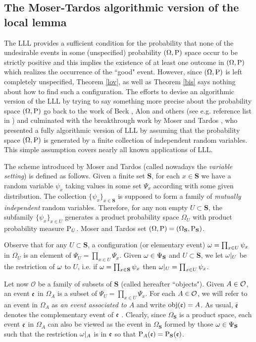\documentclass[11pt]{article}
\let\O=\Omega \let\P=\Pi \let\Ps=\Psi \let\Si=\Sigma \let\X=\Xi
\let\\=\noindent
\begin{document}
\subsection{The Moser-Tardos algorithmic version of the local lemma}
The LLL provides a sufficient condition for the probability that
none of the undesirable events in some (unspecified) probability $(\O,\prob)$ space occur to be strictly positive  and this
implies the existence of at least one outcome in $(\O,\prob)$
which realizes the occurrence of the ``good" event.  However, since  $(\O,\prob)$  is left completely unspecified,   Theorem \ref{lov},
as well as Theorem \ref{bis}  says nothing about how to find
such a configuration. The efforts to devise an  algorithmic version of the LLL by trying to say something more precise
about the probability space  $(\O,\prob)$   go back to the work of Beck
 \cite{B},  Alon \cite{A} and others   (see e.g. reference list in  \cite{Mo2}) and
 culminated with the  breakthrough work by Moser and Tardos \cite{Mo,MT}, who  presented a fully  algorithmic version
 of LLL by assuming that the   probability space $(\O,\prob)$  is generated by a finite collection of independent random variables. This simple assumption
 covers nearly  all known applications of LLL.
\def\obj{{\rm obj}}

\\The scheme   introduced by    Moser and Tardos  (called nowadays the {\it  variable setting}) is defined as follows.
  Given a finite set $\mathbf{S}$, for each  $x\in \mathbf{S}$ we have
a random variable   $\psi_x$ taking values in some set $\Psi_x$ according with some given distribution.
The collection $\{\psi_x\}_{x\in \mathbf{S}}$  is supposed to form a family of  {\it mutually independent} random variables.
Therefore, for any non empty $U\subset \mathbf{S}$, the subfamily  $\{\psi_x\}_{x\in U}$  generates a product probability space
  $\O_U$  with product probability measure ${\rm P}_U$.
  Moser and Tardos set  $(\O,\prob)=(\O_\mathbf{S}, \prob_\mathbf{S})$.

\\Observe that  for any $U\subset \mathbf{S}$, a configuration (or elementary event) $\omega=\prod_{x\in U}\psi_x$ in $\O_U$ is an element
of  $\Psi_U=\prod_{x\in U}\Psi_x$.
Given $\omega\in \Psi_\mathbf{S}$ and $U\subset  \mathbf{S} $,
 we let $\omega|_{U}$ be the restriction of $\omega$ to $U$, i.e. if $\omega=\prod_{x\in \mathbf{S}}\psi_x$ then  $\omega|_{U}=\prod_{x\in U}\psi_x$.

  \\Let now  ${{\mathcal O}}$
 be   a  family of subsets of $\mathbf{S}$ (called hereafter ``objects"). Given $A\in {{\mathcal O}}$,
an event ${\mathfrak{e}}$ in $\O_A$ is a subset of $\Psi_U=\prod_{x\in U}\Psi_x$.
For each $A\in {{\mathcal O}}$, we will refer to an event in $\O_A$  as  {\it an event associated to $A$} and write ${\rm obj}({\mathfrak{e}})=A$.
As usual, $\bar {{\mathfrak{e}}}$ denotes the complementary event
of ${\mathfrak{e}}$ . Clearly, since $\O_\mathbf{S}$
is a product space, each  event  ${\mathfrak{e}}$ in $\O_A$  can also be viewed as
the  event in $\O_\mathbf{S}$   formed by those $\omega\in \Psi_\mathbf{S}$ such that the restriction $\omega|_A$ is in $ {\mathfrak{e}}$
so that
${\rm P}_A({\mathfrak{e}})={\rm P}_\mathbf{S}({\mathfrak{e}})$.
\end{document}
